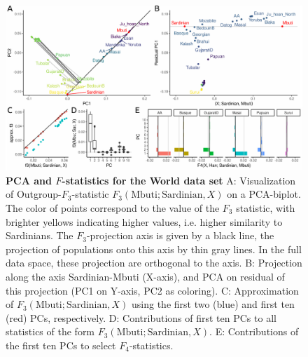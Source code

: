\documentclass[12pt,fullpage, a4paper]{article}
\begin{document}
\begin{figure}[!ht]
	\includegraphics[width=\textwidth]{figures/fig_data_world.pdf}	
	\caption{\textbf{PCA and $F$-statistics for the World data set} A: Visualization of Outgroup-$F_3$-statistic $F_3(\text{Mbuti}; \text{Sardinian}, X)$ on a PCA-biplot. The color of points correspond to the value of the $F_3$ statistic, with brighter yellows indicating higher values, i.e. higher similarity to Sardinians. The $F_3$-projection axis is given by a black line, the projection of populations onto this axis by thin gray lines. In the full data space, these projection are orthogonal to the axis. B: Projection along the axis Sardinian-Mbuti (X-axis), and PCA on residual of this projection (PC1 on Y-axis, PC2 as coloring). C: Approximation of $F_3(\text{Mbuti}; \text{Sardinian}, X)$ using the first two (blue) and first ten (red) PCs, respectively. D: Contributions of first ten PCs to all statistics of the form $F_3(\text{Mbuti}; \text{Sardinian}, X)$. E: Contributions of the first ten PCs to select $F_4$-statistics.  
	}	
	\label{fig:f4}
\end{figure}


\end{document}
